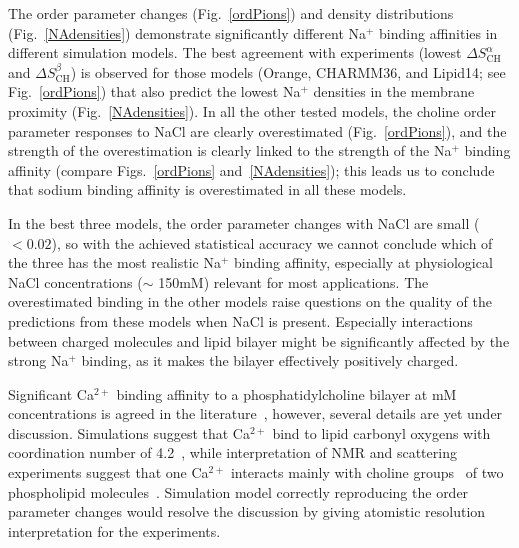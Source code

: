 \documentclass[twoside,twocolumn,9pt]{article}
\begin{document}
The order parameter changes (Fig.~\ref{ordPions}) and density distributions (Fig.~\ref{NAdensities})
demonstrate significantly different Na$^+$ binding affinities in different simulation models.
The best agreement with experiments (lowest $\Delta S_\mathrm{CH}^\alpha$ and $\Delta S_\mathrm{CH}^\beta$) is observed for those models (Orange, CHARMM36, and Lipid14; see Fig.~\ref{ordPions}) that also predict the lowest Na$^+$ densities 
in the membrane proximity (Fig.~\ref{NAdensities}).
In all the other tested models, the choline order parameter 
responses to NaCl are clearly overestimated (Fig.~\ref{ordPions}),
and the strength of the overestimation is clearly linked to the strength of the
Na$^+$ binding affinity (compare Figs.~\ref{ordPions} and~\ref{NAdensities});
this leads us to
conclude that sodium binding affinity is overestimated in all these models.


In the best three models, the order parameter changes with NaCl are small ($<0.02$), so
with the achieved statistical accuracy we cannot conclude 
which of the three has the most realistic Na$^+$ binding affinity,
especially at physiological NaCl concentrations ($\sim$ 150mM) 
relevant for most applications. 
The overestimated binding in the other models raise questions on the quality of the predictions from these models when NaCl is present.
Especially interactions between charged molecules and lipid bilayer might be significantly
affected by the strong Na$^+$ binding, as it makes the bilayer effectively positively charged.

Significant Ca$^{2+}$ binding affinity to a phosphatidylcholine bilayer at mM concentrations  
is agreed in the literature~\cite{akutsu81,altenbach84,cevc90,tocanne90}, however, several
details are yet under discussion. Simulations suggest that Ca$^{2+}$ bind to lipid carbonyl
oxygens with coordination number of 4.2~\cite{bockmann04}, while interpretation of NMR and 
scattering experiments suggest that one Ca$^{2+}$ interacts mainly with choline 
groups~\cite{hauser76,hauser78,herbette84} of two phospholipid molecules~\cite{altenbach84}. 
Simulation model correctly reproducing the order parameter changes would resolve the discussion
by giving atomistic resolution interpretation for the experiments.
\end{document}
